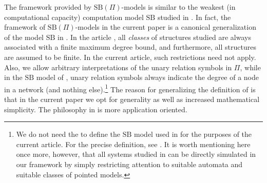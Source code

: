 \documentclass[copyright,creativecommons]{eptcs}
\begin{document}
The framework provided by $\mathrm{SB}(\Pi)$-models is similar to
the weakest (in computational capacity) computation model $\mathrm{SB}$ studied in \cite{hella, hella2}.
In fact, the framework of $\mathrm{SB}(\Pi)$-models in the current paper is a canonical
generalization of the model $\mathrm{SB}$ in \cite{hella, hella2}.
In the article \cite{hella, hella2}, all \emph{classes} of structures
studied are always associated with a finite maximum degree bound,
and furthermore, all structures are assumed to be finite.
In the current article, such restrictions need not apply.
Also, we allow arbitrary interpretations of the unary relation symbols in $\Pi$,
while in the $\mathrm{SB}$ model of \cite{hella, hella2}, unary relation symbols
always indicate the degree of a node in a network (and nothing else).\hspace{0.4mm}\footnote{We 
do not need the to define the $\mathrm{SB}$ model
used in \cite{hella, hella2} for the purposes of the current article.
For the precise definition, see \cite{hella, hella2}. It is worth mentioning here once more, however,  
that all systems studied in \cite{hella, hella2} can be directly simulated in our framework
by simply restricting attention to suitable automata and suitable classes of pointed models.}
The reason for generalizing the definition of \cite{hella, hella2} is that in the current paper
we opt for generality as well as increased mathematical simplicity.
The philosophy in \cite{hella, hella2} is more application oriented.
\end{document}
